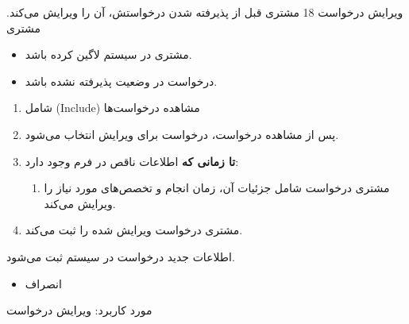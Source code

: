{
	\usecase
	{ویرایش درخواست}
	{18}
	{مشتری قبل از پذیرفته شدن درخواستش، آن را ویرایش می‌کند.}
	{مشتری}
	{}
	{
		
		\begin{itemize}
			\item
			مشتری در سیستم لاگین کرده باشد.
			
			\item 
			درخواست در وضعیت پذیرفته نشده باشد.
			
		\end{itemize}	
		
		
	}
	{
		\vspace*{-0.6cm}
		\begin{enumerate}
			\item
				شامل (Include) مشاهده درخواست‌ها
				
				\item
				پس از مشاهده درخواست، درخواست برای ویرایش انتخاب می‌شود.
				
				\item 
				\textbf{تا زمانی که}
				اطلاعات ناقص در فرم وجود دارد:
				\begin{enumerate}[label=\theenumi.\arabic*.]
					\item 
	مشتری درخواست شامل جزئیات آن، زمان انجام و تخصص‌های مورد نیاز را ویرایش می‌کند.
				\end{enumerate}
				\item 
			مشتری درخواست ویرایش شده را ثبت می‌کند.
				
			
		\end{enumerate}
	}
	{اطلاعات جدید درخواست در سیستم ثبت می‌شود.}
	{
		\begin{itemize}
			\vspace*{-0.6cm}
			\item انصراف
		\end{itemize}
	}
	{
		مورد کاربرد: ویرایش درخواست
	}
	
}



